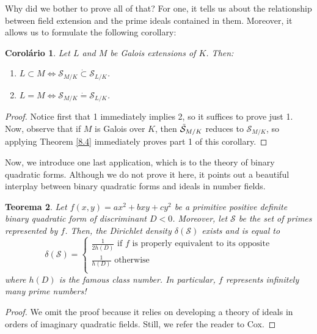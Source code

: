 \documentclass{article}
\theoremstyle{plain}
\newtheorem{thm}{Teorema}
\newtheorem{cor}[thm]{Corolário}
\theoremstyle{definition}
\theoremstyle{remark}
\numberwithin{equation}{section}
\numberwithin{thm}{section}
\begin{document}
Why did we bother to prove all of that? For one, it tells us about the relationship between field extension and the prime ideals contained in them. Moreover, it allows us to formulate the following corollary:

\begin{cor}
Let $L$ and $M$ be Galois extensions of $K$. Then:

\begin{enumerate}

    \item $L \subset M \Longleftrightarrow \mathcal{S}_{M/K} \dot{\subset} \mathcal{S}_{L/K}$.

    \item $L = M \Longleftrightarrow \mathcal{S}_{M/K} \dot{=} \mathcal{S}_{L/K}$.

\end{enumerate}

\end{cor}

\begin{proof}
Notice first that 1 immediately implies 2, so it suffices to prove just 1. Now, observe that if $M$ is Galois over $K$, then $\Tilde{\mathcal{S}}_{M/K}$ reduces to $\mathcal{S}_{M/K}$, so applying Theorem \ref{8.4} immediately proves part 1 of this corollary. 
\end{proof}

Now, we introduce one last application, which is to the theory of binary quadratic forms. Although we do not prove it here, it points out a beautiful interplay between binary quadratic forms and ideals in number fields. 

\begin{thm}
Let $f(x, y) = ax^2 + bxy + cy^2$ be a primitive positive definite binary quadratic form of discriminant $D < 0$. Moreover, let $\mathcal{S}$ be the set of primes represented by $f$. Then, the Dirichlet density $\delta(\mathcal{S})$ exists and is equal to $$\delta(\mathcal{S}) = \begin{cases}
\frac{1}{2h(D)} \text{ if } f \text{ is properly equivalent to its opposite} \\
\frac{1}{h(D)}  \text { otherwise } \\
\end{cases}$$ where $h(D)$ is the famous class number. In particular, $f$ represents infinitely many prime numbers!
\end{thm}

\begin{proof}
We omit the proof because it relies on developing a theory of ideals in orders of imaginary quadratic fields. Still, we refer the reader to Cox\cite{ref_book1}. 
\end{proof}
\end{document}
